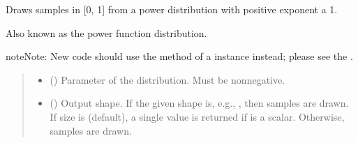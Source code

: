 \documentclass[letterpaper,10pt,english]{sphinxmanual}
\begin{document}

\begin{fulllineitems}
\label{\detokenize{metilda.controllers:metilda.controllers.pitch_art_wizard.power}}
\pysigstartsignatures
{}
\pysigstopsignatures
\sphinxAtStartPar
Draws samples in {[}0, 1{]} from a power distribution with positive
exponent a \sphinxhyphen{} 1.

\sphinxAtStartPar
Also known as the power function distribution.

\begin{sphinxadmonition}{note}{Note:}
\sphinxAtStartPar
New code should use the 
method of a  instance instead;
please see the .
\end{sphinxadmonition}
\begin{quote}\begin{description}
\begin{itemize}
\item {} 
\sphinxAtStartPar
{} () \textendash{} Parameter of the distribution. Must be non\sphinxhyphen{}negative.

\item {} 
\sphinxAtStartPar
{} (\sphinxstyleliteralemphasis{\sphinxupquote{, }}) \textendash{} Output shape.  If the given shape is, e.g., , then
 samples are drawn.  If size is  (default),
a single value is returned if  is a scalar.  Otherwise,
 samples are drawn.


\end{itemize}
\end{description}
\end{quote}
\end{fulllineitems}
\end{document}
